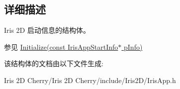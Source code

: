 \subsection{详细描述}
Iris 2D 启动信息的结构体。 

\begin{DoxySeeAlso}{参见}
\hyperlink{class_iris2_d_1_1_iris_application_ac20656815694f980fccfc4369727a9a9}{Initialize(const Iris\+App\+Start\+Info$\ast$ p\+Info)} 
\end{DoxySeeAlso}


该结构体的文档由以下文件生成\+:\begin{DoxyCompactItemize}
\item 
Iris 2\+D Cherry/\+Iris 2\+D Cherry/include/\+Iris2\+D/Iris\+App.\+h\end{DoxyCompactItemize}
